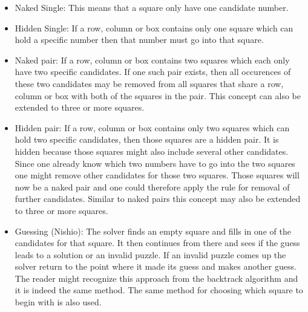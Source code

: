 \documentclass[a4paper,11pt]{kth-mag}
\begin{document}
\begin{itemize}
    \item Naked Single: 
    This means that a square only have one candidate number.
    \item Hidden Single: 
    If a row, column or box contains only one square which can hold a specific number then that number must go into that square.
    \item Naked pair:
    If a row, column or box contains two squares which each only have two specific candidates.
If one such pair exists, then all occurences of these two candidates may be removed from all squares that share a row, column or box with both of the squares in the pair.
This concept can also be extended to three or more squares.
    \item Hidden pair:
    If a row, column or box contains only two squares which can hold two specific candidates, then those squares are a hidden pair.
It is hidden because those squares might also include several other candidates.
Since one already know which two numbers have to go into the two squares one might remove other candidates for those two squares.
Those squares will now be a naked pair and one could therefore apply the rule for removal of further candidates.
Similar to naked pairs this concept may also be extended to three or more squares.

    \item Guessing (Nishio):
    The solver finds an empty square and fills in one of the candidates for that square.
    It then continues from there and sees if the guess leads to a solution or an invalid puzzle.
    If an invalid puzzle comes up the solver return to the point where it made its guess and makes another guess.
    The reader might recognize this approach from the backtrack algorithm and it is indeed the same method.
    The same method for choosing which square to begin with is also used.
\end{itemize}
\end{document}
